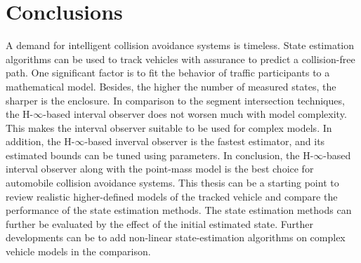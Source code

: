\chapter{Conclusions} \label{ch:conclusion}
A demand for intelligent collision avoidance systems is timeless. State estimation algorithms can be used to track vehicles with assurance to predict a collision-free path. One significant factor is to fit the behavior of traffic participants to a mathematical model. Besides, the higher the number of measured states, the sharper is the enclosure. In comparison to the segment intersection techniques, the H-$\infty$-based interval observer does not worsen much with model complexity. This makes the interval observer suitable to be used for complex models. In addition, the H-$\infty$-based inverval observer is the fastest estimator, and its estimated bounds can be tuned using parameters. In conclusion, the H-$\infty$-based interval observer along with the point-mass model is the best choice for automobile collision avoidance systems. This thesis can be a starting point to review realistic higher-defined models of the tracked vehicle and compare the performance of the state estimation methods. The state estimation methods can further be evaluated by the effect of the initial estimated state. Further developments can be to add non-linear state-estimation algorithms on complex vehicle models in the comparison.